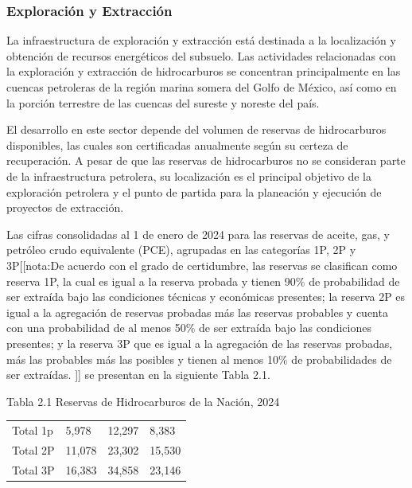 \documentclass{sener2025}
\begin{document}
\subsubsection{Exploración y Extracción}

La infraestructura de exploración y extracción está destinada a la localización y obtención de recursos energéticos del subsuelo. Las actividades relacionadas con la exploración y extracción de hidrocarburos se concentran principalmente en las cuencas petroleras de la región marina somera del Golfo de México, así como en la porción terrestre de las cuencas del sureste y noreste del país.

El desarrollo en este sector depende del volumen de reservas de hidrocarburos disponibles, las cuales son certificadas anualmente según su certeza de recuperación. A pesar de que las reservas de hidrocarburos no se consideran parte de la infraestructura petrolera, su localización es el principal objetivo de la exploración petrolera y el punto de partida para la planeación y ejecución de proyectos de extracción.

Las cifras consolidadas al 1 de enero de 2024 para las reservas de aceite, gas, y petróleo crudo equivalente (PCE), agrupadas en las categorías 1P, 2P y 3P[[nota:De acuerdo con el grado de certidumbre, las reservas se clasifican como reserva 1P, la cual es igual a la reserva probada y tienen 90\% de probabilidad de ser extraída bajo las condiciones técnicas y económicas presentes; la reserva 2P es igual a la agregación de reservas probadas más las reservas probables y cuenta con una probabilidad de al menos 50\% de ser extraída bajo las condiciones presentes; y la reserva 3P que es igual a la agregación de las reservas probadas, más las probables más las posibles y tienen al menos 10\% de probabilidades de ser extraídas.
]] se presentan en la siguiente Tabla 2.1.

\begin{tabladoradoCorto}
  \caption{Tabla 2.1 Reservas de Hidrocarburos de la Nación, 2024}
  \label{tab:tabla_2_1_reservas_de_hidrocar}
  \begin{tabularx}{\textwidth}{Vvvv}
    \toprule
      &  &  &  \\
    \midrule
    Total 1p & 5,978 & 12,297 & 8,383 \\
    Total 2P & 11,078 & 23,302 & 15,530 \\
    Total 3P & 16,383 & 34,858 & 23,146 \\
    \bottomrule
  \end{tabularx}
\end{tabladoradoCorto}
\vspace{-4pt}
\end{document}
